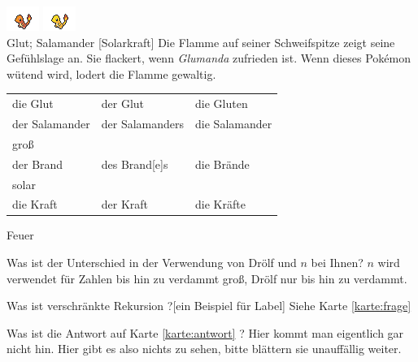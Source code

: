 \documentclass[a7paper,10pt,grid=front%
,toc
]{kartei}
\begin{document}
\begin{karte}[Großbrand]{
\includegraphics{../regular/charmander}
\includegraphics{../shiny/charmander} \\
Glut; Salamander
}[Solarkraft]
Die Flamme auf seiner Schweifspitze zeigt seine Gefühlslage an. Sie flackert,
wenn \emph{Glumanda} zufrieden ist. Wenn dieses Pokémon wütend wird, lodert die
Flamme gewaltig.

\vspace{10pt}
\begin{tabular}{lll}
die Glut	&	der Glut	&	die Gluten \\
der Salamander	&	der Salamanders & die Salamander \\
groß \\
der Brand	&	des Brand[e]s	&	die Brände \\
solar \\
die Kraft	&	der Kraft	&	die Kräfte \\
\end{tabular}
\vspace{10pt}

Feuer
\end{karte}















\begin{karte}[Zahlenkunde]{Was ist der Unterschied in der Verwendung von Drölf 
und $n$ bei Ihnen?}
$n$ wird verwendet für Zahlen bis hin zu verdammt groß, Drölf nur bis hin zu 
verdammt.

\end{karte}

\renewcommand{\kommentarstil}{\textsc}

\begin{karte}{Was ist verschränkte Rekursion ?}[ein Beispiel für Label]
\label{karte:antwort} Siehe Karte \ref{karte:frage}
\end{karte}
\begin{karte}{Was ist die Antwort auf Karte \ref{karte:antwort} ?}
\label{karte:frage}
  Hier kommt man eigentlich gar nicht hin. Hier gibt es also nichts zu sehen, 
bitte blättern sie unauffällig weiter.
\end{karte}
\end{document}
